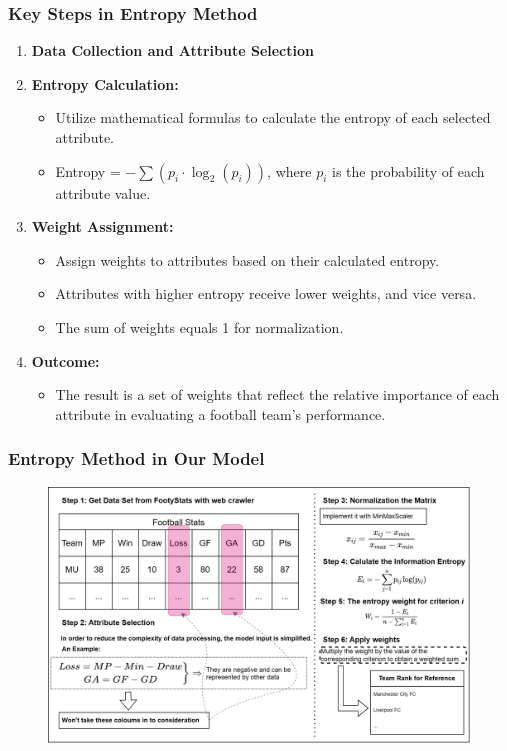\documentclass{beamer}
\begin{document}
\begin{frame}
  \frametitle{Key Steps in Entropy Method}
  \begin{enumerate}
    \item \textbf{Data Collection and Attribute Selection}
    \item \textbf{Entropy Calculation:}
          \begin{itemize}
            \item Utilize mathematical formulas to calculate the entropy of each selected attribute.
            \item Entropy = $- \sum (p_i \cdot \log_2(p_i))$, where $p_i$ is the probability of each attribute value.
          \end{itemize}

    \item \textbf{Weight Assignment:}
          \begin{itemize}
            \item Assign weights to attributes based on their calculated entropy.
            \item Attributes with higher entropy receive lower weights, and vice versa.
            \item The sum of weights equals 1 for normalization.
          \end{itemize}

    \item \textbf{Outcome:}
          \begin{itemize}
            \item The result is a set of weights that reflect the relative importance of each attribute in evaluating a football team's performance.
          \end{itemize}
  \end{enumerate}
\end{frame}
% 
% 
\begin{frame}
  \frametitle{Entropy Method in Our Model}
  \begin{figure}
    \includegraphics[width=\textwidth]{img/entropy_method_flowchart.png}
  \end{figure}
\end{frame}
% 
% 
% 
% 
% 
%  
% 
% 
% 
% 
% 
% 
% 
% 
\end{document}
